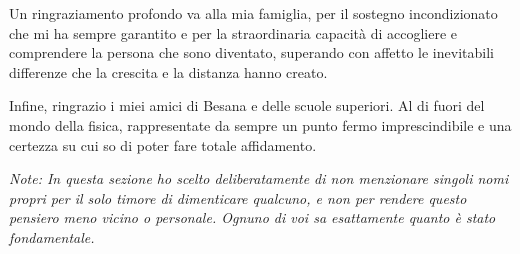 \documentclass[aps,preprint,nofootinbib,preprintnumbers,eqsecnum,superscriptaddress]{revtex4}
\numberwithin{equation}{section}
\begin{document}
Un ringraziamento profondo va alla mia famiglia, per il sostegno incondizionato che mi ha sempre garantito e per la straordinaria capacità di accogliere e comprendere la persona che sono diventato, superando con affetto le inevitabili differenze che la crescita e la distanza hanno creato.

Infine, ringrazio i miei amici di Besana e delle scuole superiori. Al di fuori del mondo della fisica, rappresentate da sempre un punto fermo imprescindibile e una certezza su cui so di poter fare totale affidamento.

\vspace{1cm}
\noindent
\textit{Note: In questa sezione ho scelto deliberatamente di non menzionare singoli nomi propri per il solo timore di dimenticare qualcuno, e non per rendere questo pensiero meno vicino o personale. Ognuno di voi sa esattamente quanto è stato fondamentale.}

\newpage


\end{document}
